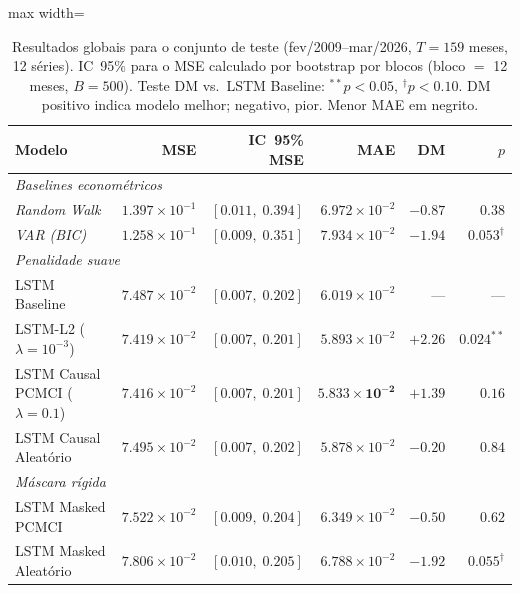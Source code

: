 \documentclass[12pt, a4paper]{article}
\begin{document}
\begin{table}[H]
\centering
\caption{Resultados globais para o conjunto de teste (fev/2009--mar/2026, $T=159$ meses, 12 séries). IC~95\% para o MSE calculado por bootstrap por blocos (bloco $=$ 12 meses, $B=500$). Teste DM vs.\ LSTM Baseline: $^{**}p<0.05$, $^{\dagger}p<0.10$. DM positivo indica modelo melhor; negativo, pior. Menor MAE em negrito.}
\label{tab:results_fred}
\small
\begin{adjustbox}{max width=\textwidth}
\begin{tabular}{lrrrrr}
\toprule
Modelo & MSE & IC~95\% MSE & MAE & DM & $p$ \\
\midrule
\multicolumn{6}{l}{\textit{Baselines econométricos}} \\
\emph{Random Walk}              & $1.397\times10^{-1}$ & $[0.011,\;0.394]$ & $6.972\times10^{-2}$ & $-0.87$ & $0.38$ \\
\emph{VAR (BIC)}                & $1.258\times10^{-1}$ & $[0.009,\;0.351]$ & $7.934\times10^{-2}$ & $-1.94$ & $0.053^{\dagger}$ \\
\midrule
\multicolumn{6}{l}{\textit{Penalidade suave}} \\
LSTM Baseline                   & $7.487\times10^{-2}$ & $[0.007,\;0.202]$ & $6.019\times10^{-2}$ & — & — \\
LSTM-L2 ($\lambda{=}10^{-3}$)   & $7.419\times10^{-2}$ & $[0.007,\;0.201]$ & $5.893\times10^{-2}$ & $+2.26$ & $0.024^{**}$ \\
LSTM Causal PCMCI ($\lambda{=}0.1$) & $7.416\times10^{-2}$ & $[0.007,\;0.201]$ & $\mathbf{5.833\times10^{-2}}$ & $+1.39$ & $0.16$ \\
LSTM Causal Aleatório           & $7.495\times10^{-2}$ & $[0.007,\;0.202]$ & $5.878\times10^{-2}$ & $-0.20$ & $0.84$ \\
\midrule
\multicolumn{6}{l}{\textit{Máscara rígida}} \\
LSTM Masked PCMCI               & $7.522\times10^{-2}$ & $[0.009,\;0.204]$ & $6.349\times10^{-2}$ & $-0.50$ & $0.62$ \\
LSTM Masked Aleatório           & $7.806\times10^{-2}$ & $[0.010,\;0.205]$ & $6.788\times10^{-2}$ & $-1.92$ & $0.055^{\dagger}$ \\
\bottomrule
\end{tabular}
\end{adjustbox}
\end{table}
\end{document}
